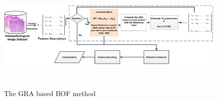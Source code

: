 \begin{figure}

\includegraphics[height=2.2in, width=6.5in]{codebook_GRA}
\caption[The GRA based BOF method]{\fontsize{10pt}{12pt}\selectfont  The GRA based BOF method}
\label{fig:GRABOF}
\end{figure}

